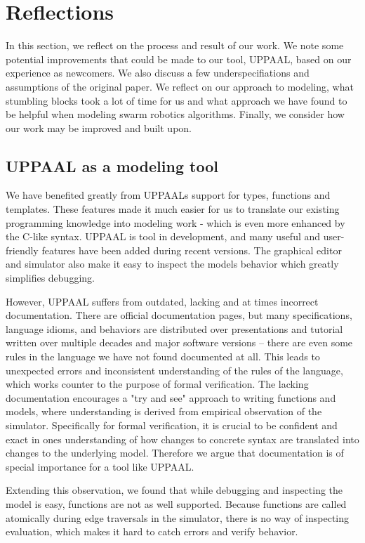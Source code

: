 \section{Reflections}

In this section, we reflect on the process and result of our work.
We note some potential improvements that could be made to our tool, UPPAAL, based on our experience as newcomers.
We also discuss a few underspecifiations and assumptions of the original paper.
We reflect on our approach to modeling, what stumbling blocks took a lot of time for us and what approach we have found to be helpful when modeling swarm robotics algorithms.
Finally, we consider how our work may be improved and built upon.

\subsection{UPPAAL as a modeling tool}

We have benefited greatly from UPPAALs support for types, functions and templates.
These features made it much easier for us to translate our existing programming knowledge into modeling work - which is even more enhanced by the C-like syntax.
UPPAAL is tool in development, and many useful and user-friendly features have been added during recent versions.
The graphical editor and simulator also make it easy to inspect the models behavior which greatly simplifies debugging.

However, UPPAAL suffers from outdated, lacking and at times incorrect documentation.
There are official documentation pages, but many specifications, language idioms, and behaviors are distributed over presentations and tutorial written over multiple decades and major software versions – there are even some rules in the language we have not found documented at all.
This leads to unexpected errors and inconsistent understanding of the rules of the language, which works counter to the purpose of formal verification.
The lacking documentation encourages a "try and see" approach to writing functions and models, where understanding is derived from empirical observation of the simulator.
Specifically for formal verification, it is crucial to be confident and exact in ones understanding of how changes to concrete syntax are translated into changes to the underlying model.
Therefore we argue that documentation is of special importance for a tool like UPPAAL.

Extending this observation, we found that while debugging and inspecting the model is easy, functions are not as well supported.
Because functions are called atomically during edge traversals in the simulator, there is no way of inspecting evaluation, which makes it hard to catch errors and verify behavior.


